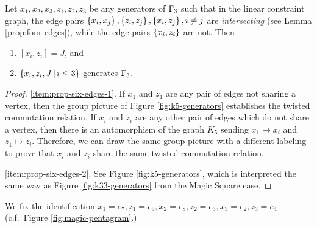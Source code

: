 \begin{lemma}\label{prop:six-edges}
 	Let $x_1,x_2,x_3,z_1,z_2,z_3$ be any generators of $\Gamma_3$ such that in the linear constraint graph, the edge pairs $\left\{x_i,x_j\right\},\left\{z_i,z_j\right\},\left\{x_i,z_j\right\},i\neq j$ are \emph{intersecting} (see Lemma \ref{prop:four-edges}), while the edge pairs $\left\{x_i,z_i\right\}$ are not. 
 	Then
 	\begin{enumerate}
 		\item\label{item:prop-six-edges-1} $[x_i,z_i] = J $, and
 	 	\item\label{item:prop-six-edges-2} $\left\{x_i,z_i, J\,\middle\vert\,i\leq 3\right\}$ generates $\Gamma_3$.
 	\end{enumerate}
 \end{lemma} 
 \begin{proof}

 	\ref{item:prop-six-edges-1}.
 	If $x_1$ and $z_1$ are any pair of edges not sharing a vertex, then the group picture of Figure \ref{fig:k5-generators} establishes the twisted commutation relation. If $x_i$ and $z_i$ are any other pair of edges which do not share a vertex, then there is an automorphism of the graph $K_{5}$ sending $x_1\mapsto x_i$ and $z_1\mapsto z_i$. Therefore, we can draw the same group picture with a different labeling to prove that $x_i$ and $z_i$ share the same twisted commutation relation.
 	
 	\ref{item:prop-six-edges-2}.
 	See Figure \ref{fig:k5-generators}, which is interpreted the same way as Figure \ref{fig:k33-generators} from the Magic Square case.
 \end{proof}
We fix the identification $x_1 = e_7, z_1 = e_9, x_2 = e_8, z_2 = e_3, x_3 = e_2, z_3 = e_4$ (c.f.\ Figure \ref{fig:magic-pentagram}.)

